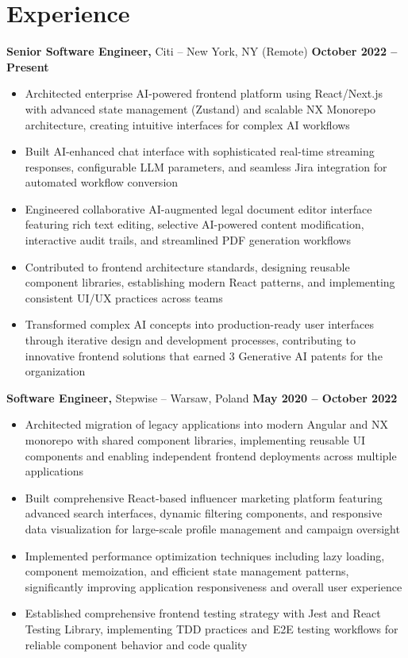 \documentclass[10pt]{article}       %
\begin{document}
\section*{Experience}
\textbf{Senior Software Engineer,} Citi -- New York, NY (Remote) \hfill \textbf{October 2022 -- Present} \\
\vspace{-5pt}
\begin{itemize}
  \item Architected enterprise AI-powered frontend platform using React/Next.js with advanced state management (Zustand) and scalable NX Monorepo architecture, creating intuitive interfaces for complex AI workflows
  \item Built AI-enhanced chat interface with sophisticated real-time streaming responses, configurable LLM parameters, and seamless Jira integration for automated workflow conversion
  \item Engineered collaborative AI-augmented legal document editor interface featuring rich text editing, selective AI-powered content modification, interactive audit trails, and streamlined PDF generation workflows
  \item Contributed to frontend architecture standards, designing reusable component libraries, establishing modern React patterns, and implementing consistent UI/UX practices across teams
  \item Transformed complex AI concepts into production-ready user interfaces through iterative design and development processes, contributing to innovative frontend solutions that earned 3 Generative AI patents for the organization
\end{itemize}

\textbf{Software Engineer,} Stepwise -- Warsaw, Poland \hfill \textbf{May 2020 -- October 2022} \\
\vspace{-5pt}
\begin{itemize}
  \item Architected migration of legacy applications into modern Angular and NX monorepo with shared component libraries, implementing reusable UI components and enabling independent frontend deployments across multiple applications
  \item Built comprehensive React-based influencer marketing platform featuring advanced search interfaces, dynamic filtering components, and responsive data visualization for large-scale profile management and campaign oversight
  \item Implemented performance optimization techniques including lazy loading, component memoization, and efficient state management patterns, significantly improving application responsiveness and overall user experience
  \item Established comprehensive frontend testing strategy with Jest and React Testing Library, implementing TDD practices and E2E testing workflows for reliable component behavior and code quality
\end{itemize}
\end{document}
